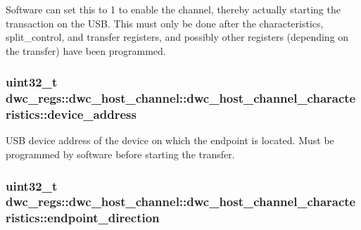 Software can set this to 1 to enable the channel, thereby actually starting the transaction on the U\-S\-B. This must only be done after the characteristics, split\-\_\-control, and transfer registers, and possibly other registers (depending on the transfer) have been programmed. \hypertarget{uniondwc__regs_1_1dwc__host__channel_1_1dwc__host__channel__characteristics_afdbfb9552ec600db3b1593bc779333f4}{
\subsubsection[{device\-\_\-address}]{\setlength{\rightskip}{0pt plus 5cm}uint32\-\_\-t dwc\-\_\-regs\-::dwc\-\_\-host\-\_\-channel\-::dwc\-\_\-host\-\_\-channel\-\_\-characteristics\-::device\-\_\-address}}\label{uniondwc__regs_1_1dwc__host__channel_1_1dwc__host__channel__characteristics_afdbfb9552ec600db3b1593bc779333f4}
U\-S\-B device address of the device on which the endpoint is located. Must be programmed by software before starting the transfer. \hypertarget{uniondwc__regs_1_1dwc__host__channel_1_1dwc__host__channel__characteristics_a5996dcb8a515c135ea3144390cea5646}{
\subsubsection[{endpoint\-\_\-direction}]{\setlength{\rightskip}{0pt plus 5cm}uint32\-\_\-t dwc\-\_\-regs\-::dwc\-\_\-host\-\_\-channel\-::dwc\-\_\-host\-\_\-channel\-\_\-characteristics\-::endpoint\-\_\-direction}}\label{uniondwc__regs_1_1dwc__host__channel_1_1dwc__host__channel__characteristics_a5996dcb8a515c135ea3144390cea5646}
